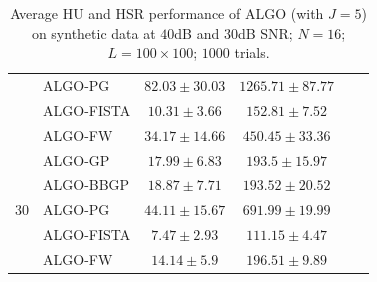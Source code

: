 \begin{table}[h]
\begin{adjustbox}{max width=\textwidth}
\begin{tabular}{|c|l|c|c|c|c|}
                    & ALGO-PG                    & $82.03    \pm 30.03$  & $1265.71  \pm 87.77$ \tabularnewline
                    & ALGO-FISTA                 & $10.31    \pm 3.66$   & $152.81   \pm 7.52$  \tabularnewline
                    & ALGO-FW                    & $34.17    \pm 14.66$  & $450.45   \pm 33.36$ \tabularnewline \cline{1-4}
\multirow{5}{*}{30} & ALGO-GP                    & $17.99    \pm 6.83$   & $193.5    \pm 15.97$ \tabularnewline
                    & ALGO-BBGP                  & $18.87    \pm 7.71$   & $193.52   \pm 20.52$ \tabularnewline
                    & ALGO-PG                    & $44.11    \pm 15.67$  & $691.99   \pm 19.99$ \tabularnewline
                    & ALGO-FISTA                 & $7.47     \pm 2.93$   & $111.15   \pm 4.47$  \tabularnewline
                    & ALGO-FW                    & $14.14    \pm 5.9$    & $196.51   \pm 9.89$  \tabularnewline \cline{1-4}
\end{tabular}
\end{adjustbox}
\caption{Average HU and HSR performance of ALGO (with $J=5$) on synthetic
         data at $40$dB and $30$dB SNR; $N = 16$; $L = 100 \times 100$; $1000$
         trials.}
\label{table:results_full_MO16_SNR4030dB_J5}
\end{table}

\newpage

